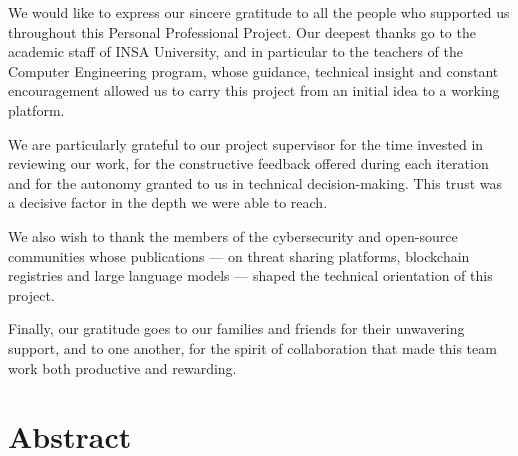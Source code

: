 \documentclass[12pt,a4paper,oneside]{book}
\begin{document}
We would like to express our sincere gratitude to all the people who supported
us throughout this Personal Professional Project. Our deepest thanks go to
the academic staff of INSA University, and in particular to the teachers of
the Computer Engineering program, whose guidance, technical insight and
constant encouragement allowed us to carry this project from an initial idea
to a working platform.

We are particularly grateful to our project supervisor for the time invested
in reviewing our work, for the constructive feedback offered during each
iteration and for the autonomy granted to us in technical decision-making.
This trust was a decisive factor in the depth we were able to reach.

We also wish to thank the members of the cybersecurity and open-source
communities whose publications --- on threat sharing platforms, blockchain
registries and large language models --- shaped the technical orientation
of this project.

Finally, our gratitude goes to our families and friends for their unwavering
support, and to one another, for the spirit of collaboration that made this
team work both productive and rewarding.

\frontmatter

\chapter*{Abstract}
\end{document}
